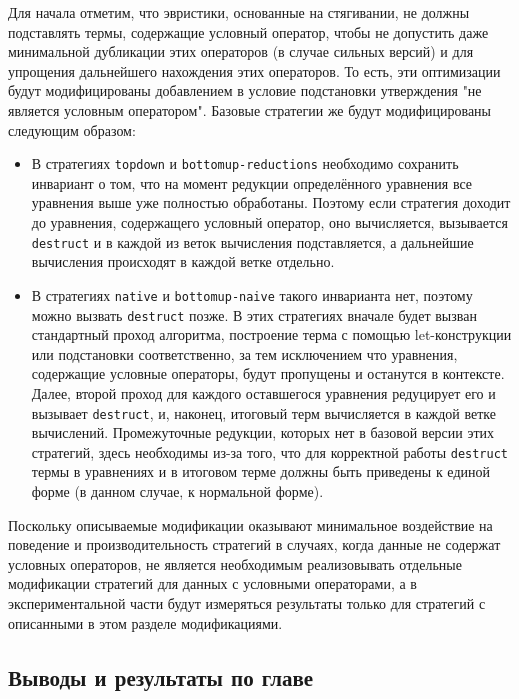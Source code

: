 \documentclass[../diploma.tex]{subfiles}
\begin{document}
Для начала отметим, что эвристики, основанные на стягивании, не должны подставлять термы, содержащие условный оператор, чтобы не допустить даже минимальной дубликации этих операторов (в случае сильных версий) и для упрощения дальнейшего нахождения этих операторов. То есть, эти оптимизации будут модифицированы добавлением в условие подстановки утверждения "не является условным оператором". Базовые стратегии же будут модифицированы следующим образом:

\begin{itemize}
  \item В стратегиях \texttt{topdown} и \texttt{bottomup-reductions} необходимо сохранить инвариант о том, что на момент редукции определённого уравнения все уравнения выше уже полностью обработаны. Поэтому если стратегия доходит до уравнения, содержащего условный оператор, оно вычисляется, вызывается \texttt{destruct} и в каждой из веток вычисления подставляется, а дальнейшие вычисления происходят в каждой ветке отдельно.
  \item В стратегиях \texttt{native} и \texttt{bottomup-naive} такого инварианта нет, поэтому можно вызвать \texttt{destruct} позже. В этих стратегиях вначале будет вызван стандартный проход алгоритма, построение терма с помощью let-конструкции или подстановки соответственно, за тем исключением что уравнения, содержащие условные операторы, будут пропущены и останутся в контексте. Далее, второй проход для каждого оставшегося уравнения редуцирует его и вызывает \texttt{destruct}, и, наконец, итоговый терм вычисляется в каждой ветке вычислений. Промежуточные редукции, которых нет в базовой версии этих стратегий, здесь необходимы из-за того, что для корректной работы \texttt{destruct} термы в уравнениях и в итоговом терме должны быть приведены к единой форме (в данном случае, к нормальной форме).
\end{itemize}

Поскольку описываемые модификации оказывают минимальное воздействие на поведение и производительность стратегий в случаях, когда данные не содержат условных операторов, не является необходимым реализовывать отдельные модификации стратегий для данных с условными операторами, а в экспериментальной части будут измеряться результаты только для стратегий с описанными в этом разделе модификациями.

\subsection{Выводы и результаты по главе}
\end{document}
